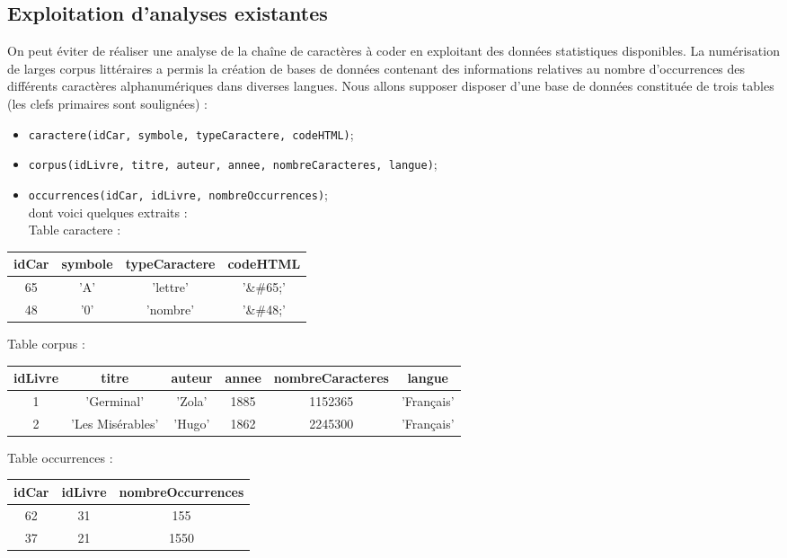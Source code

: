 \subsection{Exploitation d'analyses existantes}
On peut éviter de réaliser une analyse de la chaîne de caractères à coder en exploitant des données statistiques disponibles. La numérisation de larges corpus littéraires a permis la création de bases de données contenant des informations relatives au nombre d'occurrences des différents caractères alphanumériques dans diverses langues. Nous allons supposer disposer d'une base de données constituée de trois tables (les clefs primaires sont soulignées) :

\begin{itemize}
  \item \lstinline{caractere(idCar, symbole, typeCaractere, codeHTML)};
  \item \lstinline{corpus(idLivre, titre, auteur, annee, nombreCaracteres, langue)};
  \item \lstinline{occurrences(idCar, idLivre, nombreOccurrences)};\\
dont voici quelques extraits :\\
Table caractere :
\end{itemize}

\begin{center}
\begin{tabular}{|c|c|c|c|}
\hline
idCar & symbole & typeCaractere & codeHTML \\
\hline\hline
65 & 'A' & 'lettre' & '\&\#65;' \\
48 & '0' & 'nombre' & '\&\#48;' \\
\end{tabular}
\end{center}

Table corpus :

\begin{center}
\begin{tabular}{|c|c|c|c|c|c|}
\hline
idLivre & titre & auteur & annee & nombreCaracteres & langue \\
\hline\hline
1 & 'Germinal' & 'Zola' & 1885 & 1152365 & 'Français' \\
2 & 'Les Misérables' & 'Hugo' & 1862 & 2245300 & 'Français' \\
\end{tabular}
\end{center}

Table occurrences :

\begin{center}
\begin{tabular}{|c|c|c|}
\hline
idCar & idLivre & nombreOccurrences \\
\hline\hline
62 & 31 & 155 \\
37 & 21 & 1550 \\
\end{tabular}
\end{center}

